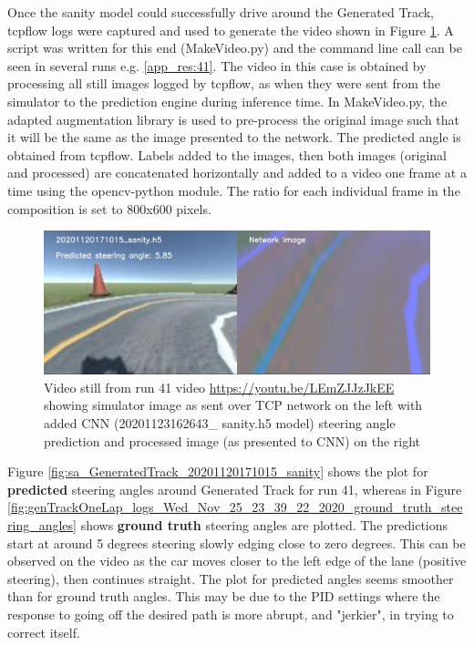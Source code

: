 Once the sanity model could successfully drive around the Generated Track, tcpflow logs were captured and used to generate the video shown in Figure \ref{fig:20201120171015_sanity_sim_network}. A script was written for this end (MakeVideo.py) and the command line call can be seen in several runs e.g. \ref{app_res:41}. The video in this case is obtained by processing all still images logged by tcpflow, as when they were sent from the simulator to the prediction engine during inference time. In MakeVideo.py, the adapted \cite{Naoki2016} augmentation library is used to pre-process the original image such that it will be the same as the image presented to the network. The predicted angle is obtained from tcpflow. Labels added to the images, then both images (original and processed) are concatenated horizontally and added to a video one frame at a time using the opencv-python module. The ratio for each individual frame in the composition is set to 800x600 pixels.
\begin{figure}[ht]
 \centering 
 \includegraphics[width=\textwidth]{Figures/20201120171015_sanity_sim_network.png}
 \caption{Video still from run 41 video  \url{https://youtu.be/LEmZJJzJkEE} showing simulator image as sent over TCP network on the left with added CNN (20201123162643\_ sanity.h5 model) steering angle prediction and processed image (as presented to CNN) on the right}
 \label{fig:20201120171015_sanity_sim_network} 
\end{figure}

Figure \ref{fig:sa_GeneratedTrack_20201120171015_sanity} shows the plot for \textbf{predicted} steering angles around Generated Track for run 41, whereas in Figure \ref{fig:genTrackOneLap_logs_Wed_Nov_25_23_39_22_2020_ground_truth_steering_angles} shows \textbf{ground truth} steering angles are plotted. The predictions start at around 5 degrees steering slowly edging close to zero degrees. This can be observed on the video as the car moves closer to the left edge of the lane (positive steering), then continues straight.
The plot for predicted angles seems smoother than for ground truth angles. This may be due to the PID settings where the response to going off the desired path is more abrupt, and "jerkier", in trying to correct itself.

